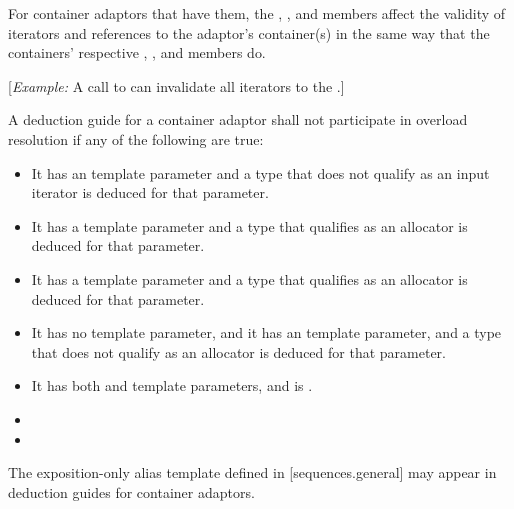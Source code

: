 \begin{addedblock}
\pnum
For container adaptors that have them, the , ,
and  members affect the validity of iterators and references to
the adaptor's container(s) in the same way that the containers'
respective , , and  members do.

[\textit{Example:} A call to  can invalidate all iterators to
the .]
\end{addedblock}

\pnum
A deduction guide for a container adaptor shall not participate in overload resolution if any of the following are true:
\begin{itemize}
\item It has an  template parameter and a type that does not qualify as an input iterator is deduced for that parameter.
\item It has a  template parameter and a type that qualifies as an allocator is deduced for that parameter.
\item It has a  template parameter and a type that qualifies as an allocator is deduced for that parameter.
\item It has no  template parameter, and it has an  template parameter, and a type that does not qualify as an allocator is deduced for that parameter.
\item It has both  and  template parameters, and  is .
\item {}
\item {}
\end{itemize}

\pnum
The exposition-only alias template  defined in
[sequences.general] may appear in
deduction guides for container adaptors.

